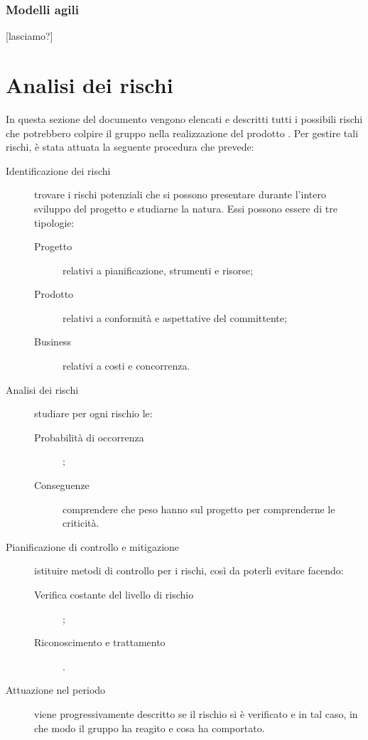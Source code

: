 		\subsubsection{Modelli agili}
[lasciamo?]



\newpage \section{Analisi dei rischi} \label{sec:analisi}
In questa sezione del documento vengono elencati e descritti tutti i possibili rischi che potrebbero colpire il gruppo \hx{} nella realizzazione del prodotto \proj. Per gestire tali rischi, è stata attuata la seguente procedura che prevede:
\begin{description}
	\item[Identificazione dei rischi] trovare i rischi potenziali che si possono presentare durante l'intero sviluppo del progetto e studiarne la natura. Essi possono essere di tre tipologie:
	\begin{description}
		\item[Progetto] relativi a pianificazione, strumenti e risorse;
		\item[Prodotto] relativi a conformità e aspettative del committente;
		\item[Business] relativi a costi e concorrenza.
	\end{description}
	\item[Analisi dei rischi] studiare per ogni rischio le:
	\begin{description}
		\item[Probabilità di occorrenza];
		\item[Conseguenze] comprendere che peso hanno sul progetto per comprenderne le criticità.
	\end{description}
	\item[Pianificazione di controllo e mitigazione] istituire metodi di controllo per i rischi, così da poterli evitare facendo:
	\begin{description}
		\item[Verifica costante del livello di rischio];
		\item[Riconoscimento e trattamento].
	\end{description}
	\item[Attuazione nel periodo] viene progressivamente descritto se il rischio si è verificato e in tal caso, in che modo il gruppo ha reagito e cosa ha comportato.
\end{description}
